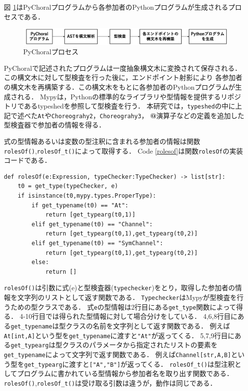 \documentclass{thesis}
\newcommand{\mblue}[1]{\textbf{\textsf{\color{MidnightBlue}#1}}}
\begin{document}
図 \ref{pychoralprocess}はPyChoralプログラムから各参加者のPythonプログラムが生成されるプロセスである．
\begin{figure}[H]
  \centering
  \includegraphics[scale=0.4]{image/pychoralprocess.png}
  \caption{PyChoralプロセス}
  \label{pychoralprocess}
\end{figure}
PyChoralで記述されたプログラムは一度抽象構文木に変換されて保存される．この構文木に対して型検査を行った後に，エンドポイント射影により
各参加者の構文木を再構築する．この構文木をもとに各参加者のPythonプログラムが生成される．
Mypyは，Pythonの標準的なライブラリや型情報を提供するリポジトリである\textsf{typeshed}を参照して型検査を行う．
本研究では，\texttt{typeshed}の中に上記で述べた\texttt{At}や\texttt{Choreograhy2}，\texttt{Choreograhy3}，
\mblue{@}演算子などの定義を追加した型検査器で参加者の情報を得る．

式の型情報あるいは変数の型注釈に含まれる参加者の情報は関数\texttt{rolesOf()},\texttt{rolesOf\_t()}によって取得する．
Code \ref{rolesof}は関数\texttt{rolesOf}の実装コードである．
\begin{lstlisting}[caption= rolesOf, label = rolesof]
def rolesOf(e:Expression, typeChecker:TypeChecker) -> list[str]:
    t0 = get_type(typeChecker, e)
    if isinstance(t0,mypy.types.ProperType):
        if get_typename(t0) == "At":
            return [get_typearg(t0,1)]
        elif get_typename(t0) == "Channel":
            return [get_typearg(t0,1),get_typearg(t0,2)]
        elif get_typename(t0) == "SymChannel":
            return [get_typearg(t0,1),get_typearg(t0,2)]
        else:
            return []
\end{lstlisting}
\texttt{rolesOf()}は引数に式(\textsf{e})と型検査器(\texttt{typechecker})をとり，取得した参加者の情報を文字列のリストとして返す関数である．
\texttt{Typechecker}はMypyが型検査を行うための型クラスである．
式\texttt{e}の型情報は2行目にある\texttt{get\_type}関数によって得る．
4-10行目では得られた型情報に対して場合分けをしている．
4,6,8行目にある\texttt{get\_typename}は型クラスの名前を文字列として返す関数である．
例えば\texttt{At[int,A]}という型を\texttt{get\_typename}に渡すと\texttt{"At"}が返ってくる．
5,7,9行目にある\texttt{get\_typearg}は型クラスのパラメータから指定されたリストの要素を\texttt{get\_typename}によって文字列で返す関数である．
例えば\texttt{Channel[str,A,B]}という型を\texttt{get\_typearg}に渡すと\texttt{["A","B"]}が返ってくる．
\texttt{rolesOf\_t()}は型注釈としてプログラムに書かれている型情報から参加者名を取り出す関数である．
\texttt{rolesOf()},\texttt{rolesOf\_t()}は受け取る引数は違うが，動作は同じである．
\end{document}
